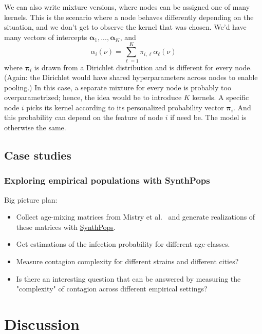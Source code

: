 \documentclass[10pt,aps,pre,twocolumn,nopacs,final,letterpaper,superscriptaddress,longbibliography]{revtex4-2}
\begin{document}
We can also write mixture versions, where nodes can be assigned one of many kernels.
This is the scenario where a node behaves differently depending on the situation, and we don't get to observe the kernel that was chosen.
We'd have many vectors of intercepts $\bm{\alpha}_1,...,\bm{\alpha}_K$, and
\begin{equation}
    \alpha_i(\nu) = \sum_{\ell=1}^K \pi_{i,\ell} \alpha_\ell (\nu)
\end{equation}
where $\bm{\pi}_i$ is drawn from a Dirichlet distribution and is different for every node.
(Again: the Dirichlet would have shared hyperparameters across nodes to enable pooling.)
In this case, a separate mixture for every node is probably too overparametrized; hence, the idea would be to introduce $K$ kernels. 
A specific node $i$ picks its kernel according to its personalized probability vector $\bm{\pi}_i$.
And this probability can depend on the feature of node $i$ if need be.
The model is otherwise the same.



\subsection{Case studies}

\subsubsection{Exploring empirical populations with SynthPops}

Big picture plan:
\begin{itemize}
    \item Collect age-mixing matrices from Mistry et al.~\cite{mistry_inferring_2021} and generate realizations of these matrices with \href{https://github.com/synthpops/synthpops}{SynthPops}.
    \item Get estimations of the infection probability for different age-classes.
    \item Measure contagion complexity for different strains and different cities?
    \item Is there an interesting question that can be answered by measuring the "complexity" of contagion across different empirical settings?
\end{itemize}

\section{Discussion}
\end{document}
